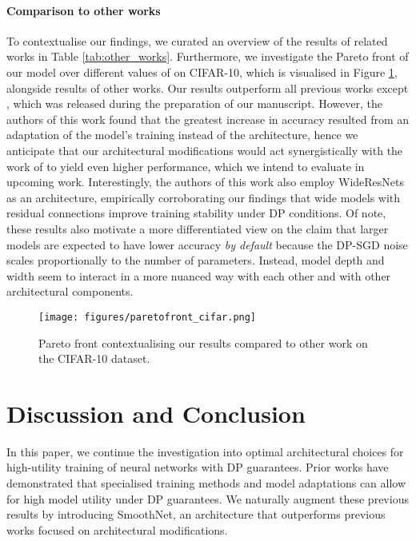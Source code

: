 \documentclass[nohyperref]{article}
\theoremstyle{plain}
\theoremstyle{definition}
\theoremstyle{remark}
\begin{document}
\paragraph{Comparison to other works}
To contextualise our findings, we curated an overview of the results of related works in Table \ref{tab:other_works}. Furthermore, we investigate the Pareto front of our model over different values of  on CIFAR-10, which is visualised in Figure \ref{fig:pareto}, alongside results of other works. Our results outperform all previous works except \citealt{de2022unlocking}, which was released during the preparation of our manuscript. However, the authors of this work found that the greatest increase in accuracy resulted from an adaptation of the model's training instead of the architecture, hence we anticipate that our architectural modifications would act synergistically with the work of \citealt{de2022unlocking} to yield even higher performance, which we intend to evaluate in upcoming work. Interestingly, the authors of this work also employ WideResNets as an architecture, empirically corroborating our findings that wide models with residual connections improve training stability under \acs{DP} conditions. Of note, these results also motivate a more differentiated view on the claim that larger models are expected to have lower accuracy \textit{by default} because the DP-SGD noise scales proportionally to the number of parameters. Instead, model depth and width seem to interact in a more nuanced way with each other and with other architectural components.
\begin{figure}
    \centering
    \texttt{[image: figures/paretofront\_cifar.png]}
    \caption{Pareto front contextualising our results compared to other work on the CIFAR-10 dataset.}
    \label{fig:pareto}
\end{figure}

\section{Discussion and Conclusion}
In this paper, we continue the investigation into optimal architectural choices for high-utility training of neural networks with DP guarantees. Prior works have demonstrated that specialised training methods and model adaptations can allow for high model utility under \acs{DP} guarantees. We naturally augment these previous results by introducing SmoothNet, an architecture that outperforms previous works focused on architectural modifications.
\end{document}
